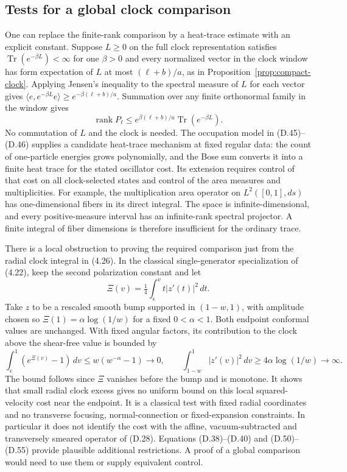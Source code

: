 \documentclass[11pt]{article}
\newcommand{\Tr}{\operatorname{Tr}}
\DeclareMathOperator{\rank}{rank}
\begin{document}
\subsection{Tests for a global clock comparison}
One can replace the finite-rank comparison by a heat-trace estimate with an explicit constant. Suppose $L\ge0$ on the full clock representation satisfies $\Tr(e^{-\beta L})<\infty$ for one $\beta>0$ and every normalized vector in the clock window has form expectation of $L$ at most $(\ell+b)/a$, as in Proposition~\ref{prop:compact-clock}. Applying Jensen's inequality to the spectral measure of $L$ for each vector gives $\langle e,e^{-\beta L}e\rangle\ge e^{-\beta(\ell+b)/a}$. Summation over any finite orthonormal family in the window gives
\begin{equation}\label{eq:clock-heat}
 \rank P_\ell\le e^{\beta(\ell+b)/a}\Tr(e^{-\beta L}) .
\end{equation}
No commutation of $L$ and the clock is needed. The occupation model in (D.45)--(D.46) supplies a candidate heat-trace mechanism at fixed regular data: the count of one-particle energies grows polynomially, and the Bose sum converts it into a finite heat trace for the stated oscillator cost. Its extension requires control of that cost on all clock-selected states and control of the area measures and multiplicities. For example, the multiplication area operator on $L^2([0,1],ds)$ has one-dimensional fibers in its direct integral. The space is infinite-dimensional, and every positive-measure interval has an infinite-rank spectral projector. A finite integral of fiber dimensions is therefore insufficient for the ordinary trace.

There is a local obstruction to proving the required comparison just from the radial clock integral in (4.26). In the classical single-generator specialization of (4.22), keep the second polarization constant and let
\[
 \Xi(v)=\tfrac14\int_\epsilon^v t|z'(t)|^2\,dt .
\]
Take $z$ to be a rescaled smooth bump supported in $(1-w,1)$, with amplitude chosen so $\Xi(1)=\alpha\log(1/w)$ for a fixed $0<\alpha<1$. Both endpoint conformal values are unchanged. With fixed angular factors, its contribution to the clock above the shear-free value is bounded by
\begin{equation}\label{eq:clock-spike}
 \int_\epsilon^1(e^{\Xi(v)}-1)\,dv\le w(w^{-\alpha}-1)\longrightarrow 0,\qquad
 \int_{1-w}^1 |z'(v)|^2\,dv\ge 4\alpha\log(1/w)\longrightarrow\infty.
\end{equation}
The bound follows since $\Xi$ vanishes before the bump and is monotone. It shows that small radial clock excess gives no uniform bound on this local squared-velocity cost near the endpoint. It is a classical test with fixed radial coordinates and no transverse focusing, normal-connection or fixed-expansion constraints. In particular it does not identify the cost with the affine, vacuum-subtracted and transversely smeared operator of (D.28). Equations (D.38)--(D.40) and (D.50)--(D.55) provide plausible additional restrictions. A proof of a global comparison would need to use them or supply equivalent control.
\end{document}
